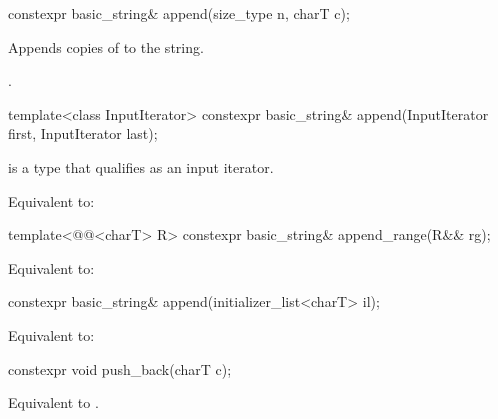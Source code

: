 %
\begin{itemdecl}
constexpr basic_string& append(size_type n, charT c);
\end{itemdecl}

\begin{itemdescr}
\pnum
\effects
Appends  copies of  to the string.

\pnum
\returns
{}.
\end{itemdescr}

%
\begin{itemdecl}
template<class InputIterator>
  constexpr basic_string& append(InputIterator first, InputIterator last);
\end{itemdecl}

\begin{itemdescr}
\pnum
\constraints
{} is a type that qualifies as an input
iterator.

\pnum
\effects
Equivalent to: 
\end{itemdescr}

%
\begin{itemdecl}
template<@@<charT> R>
  constexpr basic_string& append_range(R&& rg);
\end{itemdecl}

\begin{itemdescr}
\pnum
\effects
Equivalent to: 
\end{itemdescr}

%
\begin{itemdecl}
constexpr basic_string& append(initializer_list<charT> il);
\end{itemdecl}

\begin{itemdescr}
\pnum
\effects
Equivalent to: 
\end{itemdescr}

%
\begin{itemdecl}
constexpr void push_back(charT c);
\end{itemdecl}

\begin{itemdescr}
\pnum
\effects
Equivalent to
.
\end{itemdescr}

